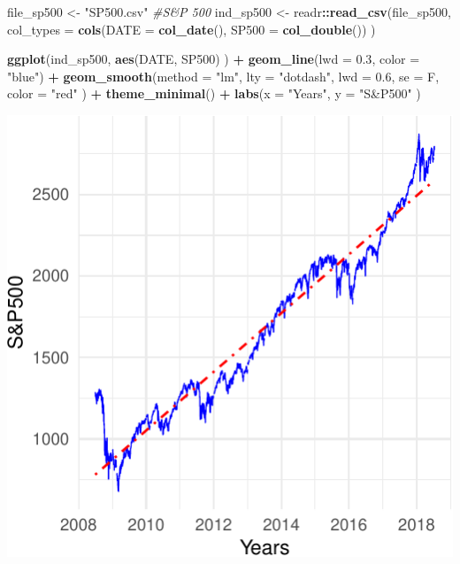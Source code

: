 \documentclass[11pt,]{article}
\newenvironment{Shaded}{\begin{snugshade}}{\end{snugshade}}
\newcommand{\KeywordTok}[1]{\textcolor[rgb]{0.13,0.29,0.53}{\textbf{#1}}}
\newcommand{\DataTypeTok}[1]{\textcolor[rgb]{0.13,0.29,0.53}{#1}}
\newcommand{\FloatTok}[1]{\textcolor[rgb]{0.00,0.00,0.81}{#1}}
\newcommand{\StringTok}[1]{\textcolor[rgb]{0.31,0.60,0.02}{#1}}
\newcommand{\CommentTok}[1]{\textcolor[rgb]{0.56,0.35,0.01}{\textit{#1}}}
\newcommand{\OperatorTok}[1]{\textcolor[rgb]{0.81,0.36,0.00}{\textbf{#1}}}
\newcommand{\NormalTok}[1]{#1}
\begin{document}
\begin{Shaded}
\begin{Highlighting}[]
\NormalTok{file_sp500 <-}\StringTok{ "SP500.csv"} \CommentTok{#S&P 500}
\NormalTok{ind_sp500 <-}\StringTok{ }\NormalTok{readr}\OperatorTok{::}\KeywordTok{read_csv}\NormalTok{(file_sp500, }
                             \DataTypeTok{col_types =} \KeywordTok{cols}\NormalTok{(}\DataTypeTok{DATE =} \KeywordTok{col_date}\NormalTok{(), }
                                              \DataTypeTok{SP500 =} \KeywordTok{col_double}\NormalTok{())}
\NormalTok{                             )}

\KeywordTok{ggplot}\NormalTok{(ind_sp500, }
       \KeywordTok{aes}\NormalTok{(DATE, SP500)}
\NormalTok{       ) }\OperatorTok{+}
\StringTok{  }\KeywordTok{geom_line}\NormalTok{(}\DataTypeTok{lwd =} \FloatTok{0.3}\NormalTok{,}
            \DataTypeTok{color =} \StringTok{"blue"}\NormalTok{) }\OperatorTok{+}
\StringTok{  }\KeywordTok{geom_smooth}\NormalTok{(}\DataTypeTok{method =} \StringTok{"lm"}\NormalTok{,}
              \DataTypeTok{lty =} \StringTok{"dotdash"}\NormalTok{,}
              \DataTypeTok{lwd =} \FloatTok{0.6}\NormalTok{,}
              \DataTypeTok{se =}\NormalTok{ F,}
              \DataTypeTok{color =} \StringTok{"red"}
\NormalTok{              ) }\OperatorTok{+}
\StringTok{  }\KeywordTok{theme_minimal}\NormalTok{() }\OperatorTok{+}
\StringTok{  }\KeywordTok{labs}\NormalTok{(}\DataTypeTok{x =} \StringTok{"Years"}\NormalTok{,}
       \DataTypeTok{y =} \StringTok{"S&P500"}
\NormalTok{       )}
\end{Highlighting}
\end{Shaded}

\begin{center}\includegraphics{FMC_T4_PhD_Fin_Time_Series_files/figure-latex/SP500-1} \end{center}
\end{document}
